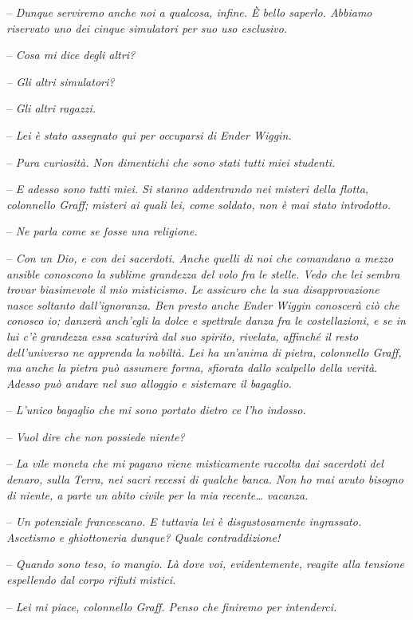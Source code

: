 {-- \emph{Dunque serviremo anche noi a qualcosa, infine. È bello
		saperlo. Abbiamo riservato uno dei cinque simulatori per suo uso
		esclusivo.}}

{-- \emph{Cosa mi dice degli altri?}}

\emph{{-- Gli altri simulatori?}}

{-- \emph{Gli altri ragazzi.}}

{-- \emph{Lei è stato assegnato qui per occuparsi di Ender Wiggin.}}

{-- \emph{Pura curiosità. Non dimentichi che sono stati tutti miei
		studenti.}}

{-- \emph{E adesso sono tutti miei. Si stanno addentrando nei misteri
		della flotta, colonnello Graff; misteri ai quali lei, come soldato, non
		è mai stato introdotto.}}

{-- \emph{Ne parla come se fosse una religione.}}

{-- \emph{Con un Dio, e con dei sacerdoti. Anche quelli di noi che
		comandano a mezzo ansible conoscono la sublime grandezza del volo fra le
		stelle. Vedo che lei sembra trovar biasimevole il mio misticismo. Le
		assicuro che la sua disapprovazione nasce soltanto dall'ignoranza. Ben
		presto anche Ender Wiggin conoscerà ciò che conosco io; danzerà
		anch'egli la dolce e spettrale danza fra le costellazioni, e se in lui
		c'è grandezza essa scaturirà dal suo spirito, rivelata, affinché il
		resto dell'universo ne apprenda la nobiltà. Lei ha un'anima di pietra,
		colonnello Graff, ma anche la pietra può assumere forma, sfiorata dallo
		scalpello della verità. Adesso può andare nel suo alloggio e sistemare
		il bagaglio.}}

{-- \emph{L'unico bagaglio che mi sono portato dietro ce l'ho indosso.}}

{-- \emph{Vuol dire che non possiede niente?}}

{-- \emph{La vile moneta che mi pagano viene misticamente raccolta dai
		sacerdoti del denaro, sulla Terra, nei sacri recessi di qualche banca.
		Non ho mai avuto bisogno di niente, a parte un abito civile per la mia
		recente\ldots{} vacanza.}}

{-- \emph{Un potenziale francescano. E tuttavia lei è disgustosamente
		ingrassato. Ascetismo e ghiottoneria dunque? Quale contraddizione!}}

{-- \emph{Quando sono teso, io mangio. Là dove voi, evidentemente,
		reagite alla tensione espellendo dal corpo rifiuti mistici.}}

{-- \emph{Lei mi piace, colonnello Graff. Penso che finiremo per
		intenderci.}}

